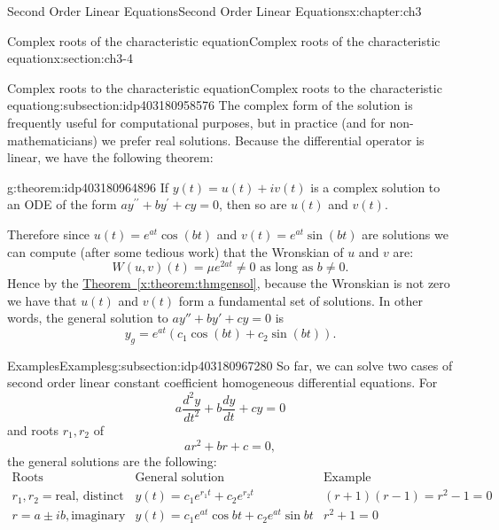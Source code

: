 \documentclass[oneside,10pt,]{book}
\newcommand{\xreffont}{\relax}
\numberwithin{equation}{section}
\numberwithin{equation}{section}
\newcommand{\amp}{&}
\begin{document}
\begin{chapterptx}{Second Order Linear Equations}{}{Second Order Linear Equations}{}{}{x:chapter:ch3}
\begin{sectionptx}{Complex roots of the characteristic equation}{}{Complex roots of the characteristic equation}{}{}{x:section:ch3-4}
\begin{subsectionptx}{Complex roots to the characteristic equation}{}{Complex roots to the characteristic equation}{}{}{g:subsection:idp403180958576}
The complex form of the solution is frequently useful for computational purposes, but in practice (and for non-mathematicians) we prefer real solutions. Because the differential operator is linear, we have the following theorem:%
\begin{theorem}{}{}{g:theorem:idp403180964896}%
If \(y(t)=u(t)+iv(t)\) is a complex solution to an ODE of the form \(ay^{\prime\prime}+by^{\prime}+cy=0\), then so are \(u(t)\) and \(v(t)\).%
\end{theorem}
Therefore since \(u(t)=e^{a t}\cos\left(b t\right)\) and \(v(t)=e^{a t}\sin\left(b t\right)\) are solutions we can compute (after some tedious work) that the Wronskian of \(u\) and \(v\) are:%
\begin{equation*}
W\left(u,v\right)(t)=\mu e^{2a t}\neq0\text{ as long as }b\neq0.
\end{equation*}
Hence by the \hyperref[x:theorem:thmgensol]{Theorem~{\xreffont\ref{x:theorem:thmgensol}}}, because the Wronskian is not zero we have that \(u(t)\) and \(v(t)\) form a fundamental set of solutions. In other words, the general solution to \(a y '' + by' + cy = 0\) is%
\begin{equation*}
y_g = e^{at} (c_1 \cos(bt) + c_2\sin(bt)).
\end{equation*}
%
\end{subsectionptx}
%
%
\typeout{************************************************}
\typeout{************************************************}
%
\begin{subsectionptx}{Examples}{}{Examples}{}{}{g:subsection:idp403180967280}
So far, we can solve two cases of second order linear constant coefficient homogeneous differential equations. For%
\begin{equation*}
a\frac{d^{2}y}{dt^{2}}+b\frac{dy}{dt}+cy=0
\end{equation*}
and roots \(r_1, r_2\) of%
\begin{equation*}
ar^{2}+br+c=0,
\end{equation*}
the general solutions are the following:%
\begin{equation*}
\begin{array}{|c|c|c|}
\hline
\text{Roots} \amp \text{General solution} \amp \text{Example}\\
\hline
r_{1},r_{2}= \text{real, distinct} \amp y(t)=c_{1}e^{r_{1}t}+c_{2}e^{r_{2}t} \amp \left(r+1\right)\left(r-1\right)=r^{2}-1=0\\
\hline
r=a \pm ib, \text{imaginary} \amp y(t)=c_{1}e^{a t}\cos b t+c_{2}e^{a t}\sin b t \amp r^{2}+1=0\\

\end{array}
\end{equation*}
\end{subsectionptx}
\end{sectionptx}
\end{chapterptx}
\end{document}
